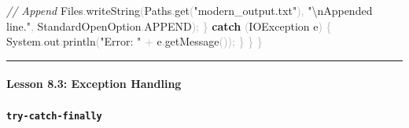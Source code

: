 \documentclass[
  justified,
  openright,
]{tufte-book}
\let\subsection\paragraph
\let\paragraph\paragraph
\newcommand{\KeywordTok}[1]{\textcolor{CodeKeyword}{\textbf{#1}}}  %
\newcommand{\StringTok}[1]{\textcolor{CodeString}{#1}}              %
\newcommand{\CommentTok}[1]{\textcolor{CodeComment}{\textit{#1}}}  %
\newcommand{\CodeFuncTok}[1]{\textcolor{CodeKeyword}{#1}}           %
\newcommand{\OperatorTok}[1]{\textcolor{DarkGray}{#1}}              %
\newenvironment{Shaded}{%
  \begin{mdframed}[style=TufteCode]%
}{%
  \end{mdframed}%
}
\let\subsection\paragraph
\let\paragraph\paragraph
\begin{document}
\begin{Shaded}
\begin{Highlighting}[]
            \CommentTok{// Append}
            Files\OperatorTok{.}\CodeFuncTok{writeString}\OperatorTok{(}Paths\OperatorTok{.}\CodeFuncTok{get}\OperatorTok{(}\StringTok{"modern\_output.txt"}\OperatorTok{),}
                \StringTok{"}\StringTok{\textbackslash{}n}\StringTok{Appended line."}\OperatorTok{,}
                StandardOpenOption\OperatorTok{.}\CodeFuncTok{APPEND}\OperatorTok{);}
        \OperatorTok{\}} \KeywordTok{catch} \OperatorTok{(}IOException e\OperatorTok{)} \OperatorTok{\{}
            System\OperatorTok{.}\CodeFuncTok{out}\OperatorTok{.}\CodeFuncTok{println}\OperatorTok{(}\StringTok{"Error: "} \OperatorTok{+} e\OperatorTok{.}\CodeFuncTok{getMessage}\OperatorTok{());}
        \OperatorTok{\}}
    \OperatorTok{\}}
\OperatorTok{\}}
\end{Highlighting}
\end{Shaded}

\begin{center}\rule{0.5\linewidth}{0.5pt}\end{center}

\subsection{Lesson 8.3: Exception
Handling}\label{lesson-8.3-exception-handling}

\subsection{\texorpdfstring{\texttt{try-catch-finally}}{try-catch-finally}}\label{try-catch-finally}
\end{document}
